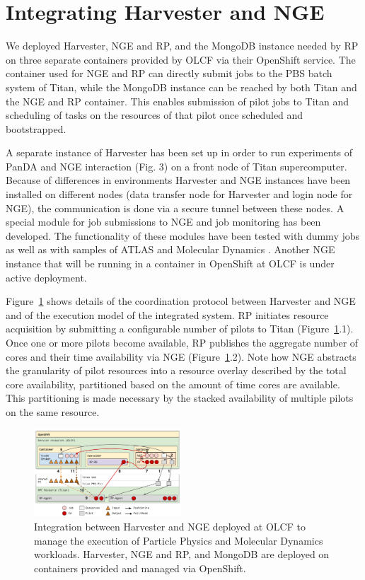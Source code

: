 \documentclass{webofc}
\begin{document}
\section{Integrating Harvester and NGE}

We deployed Harvester, NGE and RP, and the MongoDB instance needed by RP on
three separate containers provided by OLCF via their OpenShift service. The
container used for NGE and RP can directly submit jobs to the PBS batch
system of Titan, while the MongoDB instance can be reached by both Titan and
the NGE and RP container. This enables submission of pilot jobs to Titan and
scheduling of tasks on the resources of that pilot once scheduled and
bootstrapped.

A separate instance of Harvester has been set up in order to run experiments
of PanDA and NGE interaction (Fig. 3) on a front node of Titan supercomputer.
Because of differences in environments Harvester and NGE instances have been
installed on different nodes (data transfer node for Harvester and login node
for NGE), the communication is done via a secure tunnel between these nodes.
A special module for job submissions to NGE and job monitoring has been
developed. The functionality of these modules have been tested with dummy
jobs as well as with samples of ATLAS and Molecular Dynamics \cite{Brooks2009CHARMMTB}. Another
NGE instance that will be running in a container in OpenShift at OLCF is
under active deployment.

Figure~\ref{fig:integration} shows details of the coordination protocol
between Harvester and NGE and of the execution model of the integrated
system. RP initiates resource acquisition by submitting a configurable number
of pilots to Titan (Figure~\ref{fig:integration}.1). Once one or more pilots
become available, RP publishes the aggregate number of cores and their time
availability via NGE (Figure~\ref{fig:integration}.2). Note how NGE abstracts
the granularity of pilot resources into a resource overlay described by the
total core availability, partitioned based on the amount of time cores are
available. This partitioning is made necessary by the stacked availability of
multiple pilots on the same resource.

\begin{figure}
  \centering
  \includegraphics[width=0.49\textwidth]{figures/integration.pdf}
  \caption{Integration between Harvester and NGE deployed at OLCF to manage
           the execution of Particle Physics and Molecular Dynamics
           workloads. Harvester, NGE and RP, and MongoDB are deployed on
           containers provided and managed via
           OpenShift.}\label{fig:integration}
\end{figure}
\end{document}
